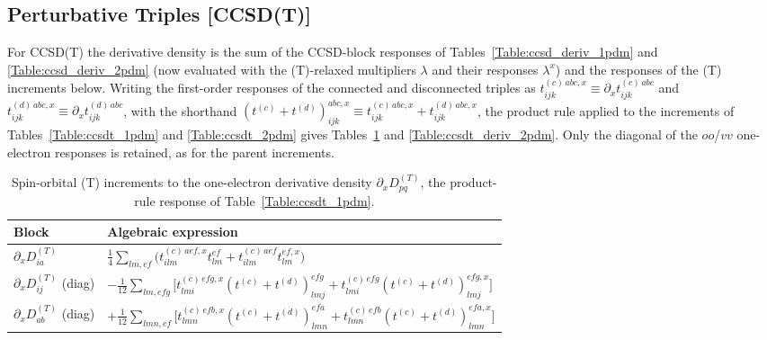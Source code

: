 \documentclass[12pt]{article}
\begin{document}
\subsection{Perturbative Triples [CCSD(T)]}
\label{sec:ccsdt_deriv_pdms}

For CCSD(T) the derivative density is the sum of the CCSD-block responses of
Tables~\ref{Table:ccsd_deriv_1pdm} and \ref{Table:ccsd_deriv_2pdm} (now evaluated
with the (T)-relaxed multipliers $\lambda$ and their responses $\lambda^x$) and
the responses of the (T) increments below.  Writing the first-order responses of
the connected and disconnected triples as
$t^{(c)\,abc,x}_{ijk}\equiv\partial_x t^{(c)\,abc}_{ijk}$ and
$t^{(d)\,abc,x}_{ijk}\equiv\partial_x t^{(d)\,abc}_{ijk}$, with the shorthand
$(t^{(c)}+t^{(d)})^{abc,x}_{ijk}\equiv t^{(c)\,abc,x}_{ijk}+t^{(d)\,abc,x}_{ijk}$,
the product rule applied to the increments of Tables~\ref{Table:ccsdt_1pdm} and
\ref{Table:ccsdt_2pdm} gives Tables~\ref{Table:ccsdt_deriv_1pdm} and
\ref{Table:ccsdt_deriv_2pdm}.  Only the diagonal of the $oo$/$vv$ one-electron
responses is retained, as for the parent increments.

\begin{table}[H]
\caption{Spin-orbital (T) increments to the one-electron derivative density
$\partial_x D^{(T)}_{pq}$, the product-rule response of
Table~\ref{Table:ccsdt_1pdm}.}
\label{Table:ccsdt_deriv_1pdm}
\renewcommand{\arraystretch}{1.6}
\begin{center}
\begin{tabular}{ll}
\hline\hline
Block & Algebraic expression \\
\hline
$\partial_x D^{(T)}_{ia}$ & $\displaystyle \frac14 \sum_{lm,ef}\big(t^{(c)\,aef,x}_{ilm} t^{ef}_{lm} + t^{(c)\,aef}_{ilm} t^{ef,x}_{lm}\big)$ \\
$\partial_x D^{(T)}_{ij}$ (diag) & $\displaystyle -\frac{1}{12} \sum_{lm,efg}\big[t^{(c)\,efg,x}_{lmi}(t^{(c)}+t^{(d)})^{efg}_{lmj} + t^{(c)\,efg}_{lmi}(t^{(c)}+t^{(d)})^{efg,x}_{lmj}\big]$ \\
$\partial_x D^{(T)}_{ab}$ (diag) & $\displaystyle +\frac{1}{12} \sum_{lmn,ef}\big[t^{(c)\,efb,x}_{lmn}(t^{(c)}+t^{(d)})^{efa}_{lmn} + t^{(c)\,efb}_{lmn}(t^{(c)}+t^{(d)})^{efa,x}_{lmn}\big]$ \\
\hline\hline
\end{tabular}
\end{center}
\end{table}
\end{document}

